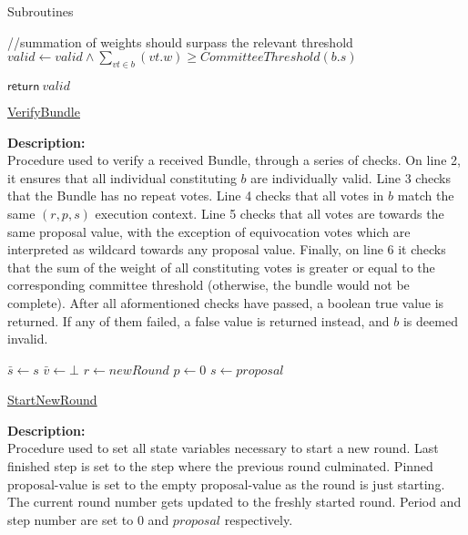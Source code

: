 \documentclass[10pt,a4paper]{article}
\begin{document}
\begin{section}{Subroutines}
\begin{algorithm}[H]
\begin{algorithmic}[1]
    //summation of weights should surpass the relevant threshold
    \State $valid \gets valid \land  \sum_{vt \in b}(vt.w) \geq CommitteeThreshold(b.s)$

    \State $\mathsf{return} \ valid$

    \EndFunction
    \end{algorithmic}
    \caption{\underline{VerifyBundle}}
\end{algorithm}

\noindent \textbf{Description:}\\
Procedure used to verify a received Bundle, through a series 
of checks.
On line 2, it ensures that all individual constituting $b$
are individually valid.
Line 3 checks that the Bundle has no repeat votes.
Line 4 checks that all votes in $b$ match the same $(r,p,s)$
execution context.
Line 5 checks that all votes are towards the same proposal value,
with the exception of equivocation votes which are interpreted as wildcard
towards any proposal value.
Finally, on line 6 it checks that the sum of the weight of all constituting
votes is greater or equal to the corresponding committee threshold (otherwise, 
the bundle would not be complete).
After all aformentioned checks have passed, a boolean true value is returned.
If any of them failed, a false value is returned instead, and $b$ is deemed invalid.


\begin{algorithm}[H]\label{algo:start-new-round}
    \begin{algorithmic}[1]

    \State $\bar{s} \gets s$
    \State $\bar{v} \gets \bot$
    \State $r \gets newRound$
    \State $p \gets 0$
    \State $s \gets proposal$

    \EndFunction
    \end{algorithmic}
    \caption{\underline{StartNewRound}}
\end{algorithm}

\noindent \textbf{Description:}\\
Procedure used to set all state variables necessary to start a new round.
Last finished step is set to the step where the previous round culminated.
Pinned proposal-value is set to the empty proposal-value as the round is just starting.
The current round number gets updated to the freshly started round.
Period and step number are set to $0$ and $proposal$ respectively.


\end{section}
\end{document}
